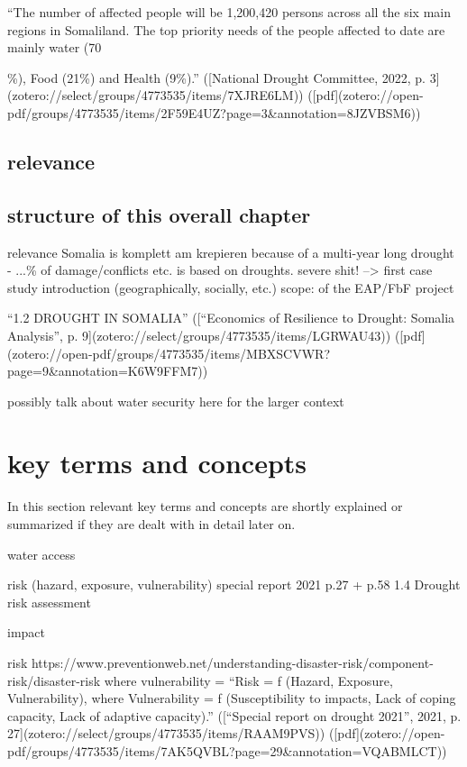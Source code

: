 “The number of affected people will be 1,200,420 persons across all the six main regions in Somaliland. The top priority needs of the people affected to date are mainly water (70{\%), Food (21\%) and Health (9\%).” ([National Drought Committee, 2022, p. 3](zotero://select/groups/4773535/items/7XJRE6LM)) ([pdf](zotero://open-pdf/groups/4773535/items/2F59E4UZ?page=3&annotation=8JZVBSM6))

\subsection{relevance}


\subsection{structure of this overall chapter}
relevance
Somalia is komplett am krepieren because of a multi-year long drought - ...\% of damage/conflicts etc. is based on droughts. severe shit! --> first case study introduction (geographically, socially, etc.) 
scope: of the EAP/FbF project

“1.2 DROUGHT IN SOMALIA” ([“Economics of Resilience to Drought: Somalia Analysis”, p. 9](zotero://select/groups/4773535/items/LGRWAU43)) ([pdf](zotero://open-pdf/groups/4773535/items/MBXSCVWR?page=9&annotation=K6W9FFM7))

possibly talk about water security here for the larger context


\section{key terms and concepts} %
In this section relevant key terms and concepts are shortly explained or summarized if they are dealt with in detail later on.


water access



risk (hazard, exposure, vulnerability)
special report 2021 p.27 + p.58 1.4 Drought risk assessment

impact

risk
https://www.preventionweb.net/understanding-disaster-risk/component-risk/disaster-risk
where vulnerability = “Risk = ƒ (Hazard, Exposure, Vulnerability), where Vulnerability = ƒ (Susceptibility to impacts, Lack of coping capacity, Lack of adaptive capacity).” ([“Special report on drought 2021”, 2021, p. 27](zotero://select/groups/4773535/items/RAAM9PVS)) ([pdf](zotero://open-pdf/groups/4773535/items/7AK5QVBL?page=29&annotation=VQABMLCT))


}
